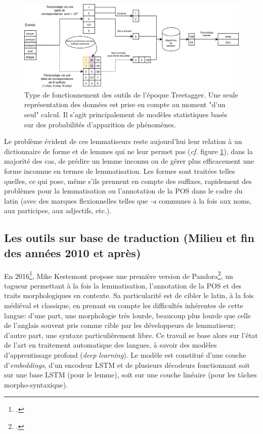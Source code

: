 \begin{figure}[h]
    \centering
    \includegraphics[width=\linewidth]{figures/chap3/outils/treetagger_type.png}
    \caption{Type de fonctionnement des outils de l'époque Treetagger. Une seule représentation des données est prise en compte au moment "d'un seul" calcul. Il s'agit principalement de modèles statistiques basés sur des probabilités d'apparition de phénomènes.}
    \label{lemmatisation:outils:type-treetagger}
\end{figure}

Le problème évident de ces lemmatiseurs reste aujourd'hui leur relation à un dictionnaire de forme et de lemmes qui ne leur permet pas (\textit{cf.} figure \ref{lemmatisation:outils:type-treetagger}), dans la majorité des cas, de prédire un lemme inconnu ou de gérer plus efficacement une forme inconnue en termes de lemmatisation. Les formes sont traitées telles quelles, ce qui pose, même s'ils prennent en compte des suffixes, rapidement des problèmes pour la lemmatisation ou l'annotation  de la POS dans le cadre du latin (avec des marques flexionnelles telles que \textit{-a} communes à la fois aux noms, aux participes, aux adjectifs, etc.).%

\subsection{Les outils sur base de traduction (Milieu et fin des années 2010 et après)}

En 2016\footcite{kestemont_initial_2016}, Mike Kestemont propose une première version de Pandora\footcite{kestemont_lemmatization_2017}, un tagueur permettant à la fois la lemmatisation, l'annotation de la POS et des traits morphologiques en contexte. Sa particularité est de cibler le latin, à la fois médiéval et classique, en prenant en compte les difficultés inhérentes de cette langue: d'une part, une morphologie très lourde, beaucoup plus lourde que celle de l'anglais souvent pris comme cible par les développeurs de lemmatiseur; d'autre part, une syntaxe particulièrement libre. Ce travail se base alors sur l'état de l'art en traitement automatique des langues, à savoir des modèles d'apprentissage profond (\textit{deep learning}). Le modèle est constitué d'une couche d'\textit{embeddings}, d'un encodeur LSTM et de plusieurs décodeurs fonctionnant soit sur une base LSTM (pour le lemme), soit sur une couche linéaire (pour les tâches morpho-syntaxique).


